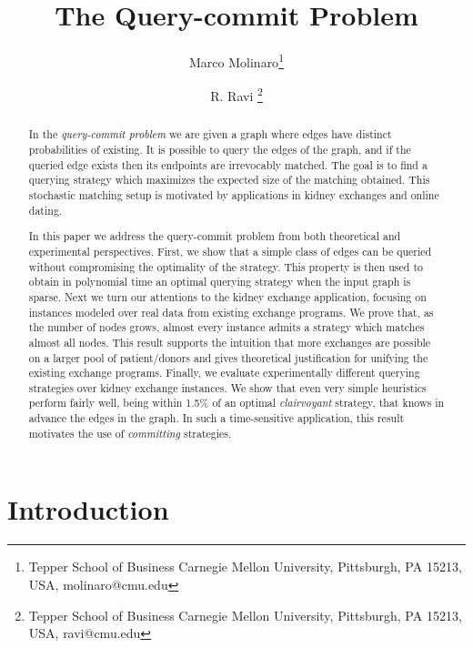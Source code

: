 \documentclass[12pt]{article}
\begin{document}
\title{The Query-commit Problem}
\author{Marco Molinaro\thanks{Tepper School of Business 
Carnegie Mellon University, Pittsburgh, PA
15213, USA, \mbox{molinaro@cmu.edu}} \and R. Ravi \thanks{Tepper School of Business 
Carnegie Mellon University, Pittsburgh, PA
15213, USA, \mbox{ravi@cmu.edu}}}
\date{}		

\maketitle

\begin{abstract}
	In the \emph{query-commit problem} we are given a graph where edges have distinct probabilities of existing. It is possible to query the edges of the graph, and if the queried edge exists then its endpoints are irrevocably matched. The goal is to find a querying strategy which maximizes the expected size of the matching obtained. This stochastic matching setup is motivated by applications in kidney exchanges and online dating.
		
		In this paper we address the query-commit problem from both theoretical and experimental perspectives. First, we show that a simple class of edges can be queried without compromising the optimality of the strategy. This property is then used to obtain in polynomial time an optimal querying strategy when the input graph is sparse. Next we turn our attentions to the kidney exchange application, focusing on instances modeled over real data from existing exchange programs. We prove that, as the number of nodes grows, almost every instance admits a strategy which matches almost all nodes. This result supports the intuition that more exchanges are possible on a larger pool of patient/donors and gives theoretical justification for unifying the existing exchange programs. Finally, we evaluate experimentally different querying strategies over kidney exchange instances. We show that even very simple heuristics perform fairly well, being within 1.5\% of an optimal \emph{clairvoyant} strategy, that knows in advance the edges in the graph. In such a time-sensitive application, this result motivates the use of \emph{committing} strategies.
\end{abstract}


	
	\section{Introduction}
	
\end{document}
